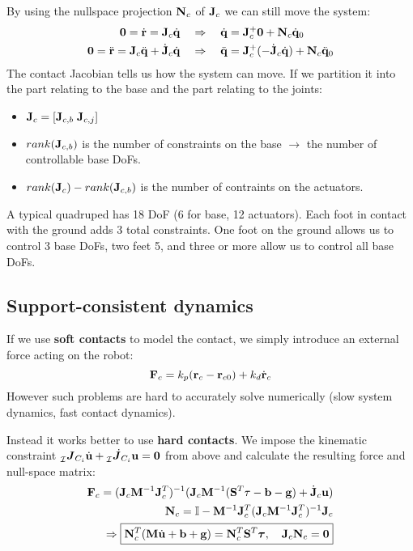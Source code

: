 \documentclass[a4paper, 8pt]{extarticle}
\newcommand{\mvec}[3]{  \prescript{}{\mathcal{#1}}{\bm{#2}}  _{#3} }
\newcommand{\mdvec}[3]{ \prescript{}{\mathcal{#1}}{\dot{\bm #2}} _{#3} }
\begin{document}
\begin{multicols*}{3}
By using the nullspace projection ${\bf N}_c$ of ${\bf J}_c$ we can still move the system:
\begin{align*}
{\bf 0} = \dot{\bf r} = {\bf J}_c\dot{\bf q}   &\quad\Rightarrow\quad   \dot{\bf q} = {\bf J}_c^+ {\bf 0} + {\bf N}_c \dot{\bf q}_0 \\ 
{\bf 0} = \ddot{\bf r} = {\bf J}_c\ddot{\bf q} + \dot{\bf J}_c\dot{\bf q}  &\quad\Rightarrow\quad  \ddot{\bf q} = {\bf J}_c^+ (-\dot{\bf J}_c\dot{\bf q}) + {\bf N}_c \ddot{\bf q}_0 
\end{align*}
The contact Jacobian tells us how the system can move. If we partition it into the part relating to the base and the part relating to the joints: 
\begin{itemize}
\item ${\bf J}_c = [{\bf J}_{c,b} \; {\bf J}_{c,j} ]$
\item $rank({\bf J}_{c,b})$ is the number of constraints on the base $\rightarrow$ the number of controllable base DoFs.
\item $rank({\bf J}_c) - rank({\bf J}_{c,b})$ is the number of contraints on the actuators.
\end{itemize}

A typical quadruped has 18 DoF (6 for base, 12 actuators). Each foot in contact with the ground adds 3 total constraints. One foot on the ground allows us to control 3 base DoFs, two feet 5, and three or more allow us to control all base DoFs.



\subsection*{Support-consistent dynamics}
If we use {\bf soft contacts} to model the contact, we simply introduce an external force acting on the robot:
$${\bf F}_c = k_p({\bf r}_c - {\bf r}_{c0}) + k_d\dot{\bf r}_c$$
However such problems are hard to accurately solve numerically (slow system dynamics, fast contact dynamics). 

Instead it works better to use {\bf hard contacts}. We impose the kinematic constraint $\mvec{I}{J}{C_i}\dot{\bf u} + \mdvec{I}{J}{C_i}{\bf u} = \bm 0$ from above and calculate the resulting force and null-space matrix:
\begin{align*}
{\bf F}_c = ({\bf J}_c{\bf M}^{-1}{\bf J}_c^T)^{-1} ({\bf J}_c{\bf M}^{-1} ({\bf S}^T {\bf \tau - b - g}) + \dot{\bf J}_c{\bf u})\\
{\bf N}_c = \mathbb{I} - {\bf M}^{-1}{\bf J}_c^T({\bf J}_c{\bf M}^{-1}{\bf J}_c^T)^{-1}{\bf J}_c \\
\Rightarrow \boxed{   
{\bf N}_c^T({\bf M}\dot{\bf u} + {\bf b + g}) = {\bf N}^T_c {\bf S}^T {\bm \tau}, \quad {\bf J}_c{\bf N}_c = {\bf 0}  }
\end{align*}


\end{multicols*}
\end{document}

